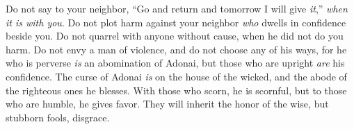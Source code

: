 \begin{biblechapter}
\verse Do not say to your neighbor, 
“Go and return and tomorrow I will give \textit{it},” 
\textit{when it is with you}.
\verse Do not plot harm against your neighbor 
\textit{who} dwells in confidence beside you.
\verse Do not quarrel with anyone without cause, 
when he did not do you harm.
\verse Do not envy a man of violence, 
and do not choose any of his ways,
\verse for he who is perverse \textit{is} an abomination of Adonai, 
but those who are upright \textit{are} his confidence.
\verse The curse of Adonai \textit{is} on the house of the wicked, 
and the abode of the righteous ones he blesses.
\verse With those who scorn, he is scornful, 
but to those who are humble, he gives favor.
\verse They will inherit the honor of the wise, 
but stubborn fools, disgrace.
\end{biblechapter}

